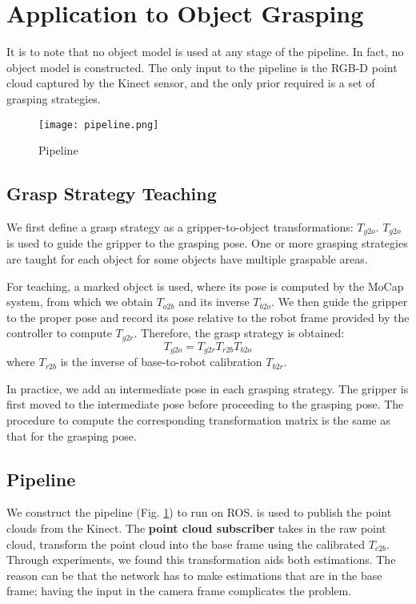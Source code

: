 \documentclass[conference]{IEEEtran}
\begin{document}
\section{Application to Object Grasping}
It is to note that no object model is used at any stage of the pipeline. In fact, no object model is constructed. The only input to the pipeline is the RGB-D point cloud captured by the Kinect sensor, and the only prior required is a set of grasping strategies.

\begin{figure}[htbp]
 \centerline{\texttt{[image: pipeline.png]}}
 \caption{Pipeline}
 \label{fig_pipeline}
\end{figure}
\subsection{Grasp Strategy Teaching}
We first define a grasp strategy as a gripper-to-object transformations: $T_{g2o}$. $T_{g2o}$ is used to guide the gripper to the grasping pose. One or more grasping strategies are taught for each object for some objects have multiple graspable areas.

For teaching, a marked object is used, where its pose is computed by the MoCap system, from which we obtain $T_{o2b}$ and its inverse $T_{b2o}$. We then guide the gripper to the proper pose and record its pose relative to the robot frame provided by the controller to compute $T_{g2r}$. Therefore, the grasp strategy is obtained:
$$T_{g2o} = T_{g2r}T_{r2b}T_{b2o}$$
where $T_{r2b}$ is the inverse of base-to-robot calibration $T_{b2r}$. 

In practice, we add an intermediate pose in each grasping strategy. The gripper is first moved to the intermediate pose before proceeding to the grasping pose. The procedure to compute the corresponding transformation matrix is the same as that for the grasping pose.

\subsection{Pipeline}
We construct the pipeline (Fig. \ref{fig_pipeline}) to run on ROS. \cite{iai_kinect2} is used to publish the point clouds from the Kinect. The \textbf{point cloud subscriber} takes in the raw point cloud, transform the point cloud into the base frame using the calibrated $T_{c2b}$. Through experiments, we found this transformation aids both estimations. The reason can be that the network has to make estimations that are in the base frame; having the input in the camera frame complicates the problem. 
\end{document}
